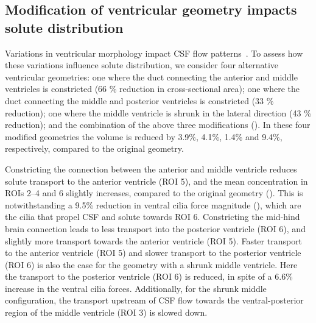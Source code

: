 \documentclass{WileyMSP-template}
\begin{document}
\subsection{Modification of ventricular geometry impacts solute distribution}
Variations in ventricular morphology impact CSF flow patterns~\cite{Olstad2019CiliaryDevelopment}.
To assess how these variations influence solute distribution,
we consider four alternative ventricular geometries:
one where the duct connecting the anterior and middle ventricles is constricted
(66 \% reduction in cross-sectional area);
one where the duct connecting the middle and posterior ventricles is constricted
(33 \% reduction);
one where the middle ventricle is shrunk in the lateral direction (43 \% reduction);
and the combination of the above three modifications (). In these
four modified geometries the volume is reduced by 3.9\%, 4.1\%, 1.4\% and 9.4\%, respectively,
compared to the original geometry.

Constricting the connection between the anterior and middle ventricle reduces
solute transport to the anterior ventricle (ROI 5),
and the mean concentration in ROIs 2--4 and 6 slightly increases, compared to the original geometry
(). This is notwithstanding a
9.5\% reduction in ventral cilia force magnitude
(), which are the cilia that propel CSF and solute towards ROI 6.
Constricting the mid-hind brain connection
leads to less transport into the posterior ventricle (ROI 6),
and slightly more transport towards the anterior ventricle (ROI 5).
Faster transport to the anterior ventricle (ROI 5) and slower transport to the
posterior ventricle (ROI 6) is also the case for the geometry with a
shrunk middle ventricle.
Here the transport to the posterior ventricle (ROI 6) is reduced,
in spite of a 6.6\% increase in the ventral cilia forces.
Additionally, for the shrunk middle configuration, the transport upstream of CSF flow towards the
ventral-posterior region of the middle ventricle (ROI 3) is slowed down.
\end{document}
